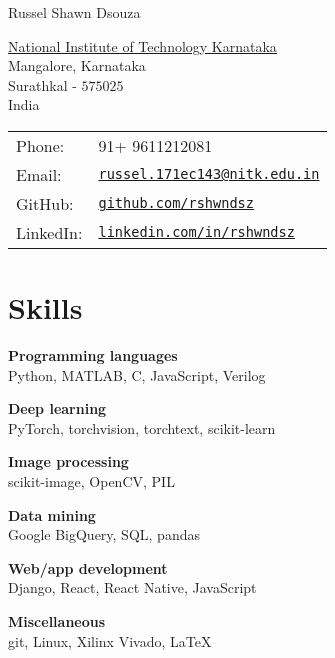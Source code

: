 \documentclass[letterpaper]{article}
\def\name{Russel Shawn Dsouza}
\renewenvironment{itemize}{
  \begin{list}{}{
    \setlength{\leftmargin}{1.5em}
  }
}{
  \end{list}
}
\begin{document}
{\huge \name}


\vspace{0.25in}

\begin{minipage}{0.45\linewidth}
  \href{http://www.nitk.ac.in/}{National Institute of Technology Karnataka} \\
  Mangalore, Karnataka \\
  Surathkal - $575025$\\
  India
\end{minipage}


\hfill
\begin{minipage}{0.45\linewidth}
  \begin{tabular}{ll}
    Phone: & 91+ 9611212081 \\
    Email: & \href{mailto:russel.171ec143@nitk.edu.in}{\tt russel.171ec143@nitk.edu.in} \\
    GitHub: & \href{https://www.github.com/rshwndsz}{\tt github.com/rshwndsz} \\
    LinkedIn: & \href{https://www.linkedin.com/in/rshwndsz}{\tt linkedin.com/in/rshwndsz}
  \end{tabular}
\end{minipage}


\section*{Skills}
  \begin{itemize}
    \item \textbf{Programming languages}\\
    Python, MATLAB, C, JavaScript, Verilog
    \item \textbf{Deep learning}\\
    PyTorch, torchvision, torchtext, scikit-learn
    \item \textbf{Image processing}\\
    scikit-image, OpenCV, PIL
    \item \textbf{Data mining}\\
    Google BigQuery, SQL, pandas
    \item \textbf{Web/app development}\\
    Django, React, React Native, JavaScript
    \item \textbf{Miscellaneous}\\
    git, Linux, Xilinx Vivado, \LaTeX
  \end{itemize}
\end{document}
